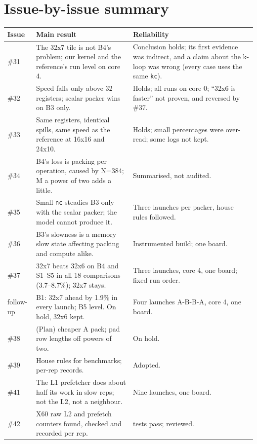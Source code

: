 \documentclass[11pt,a4paper]{article}
\begin{document}
\appendix
\newpage
\section{Issue-by-issue summary}
{\small
\begin{tabularx}{\linewidth}{@{}l >{\raggedright\arraybackslash}X >{\raggedright\arraybackslash}p{5.2cm}@{}}
\toprule
\textbf{Issue} & \textbf{Main result} & \textbf{Reliability} \\
\midrule
\#31 & The 32x7 tile is not B4's problem; our kernel and the reference's run level on core 4. & Conclusion holds; its
first evidence was indirect, and a claim about the k-loop was wrong (every case uses the same \texttt{kc}). \\
\#32 & Speed falls only above 32 registers; scalar packer wins on B3 only. & Holds; all runs on core 0; ``32x6 is
faster'' not proven, and reversed by \#37. \\
\#33 & Same registers, identical spills, same speed as the reference at 16x16 and 24x10. & Holds; small
percentages were over-read; some logs not kept. \\
\#34 & B4's loss is packing per operation, caused by N=384; M a power of two adds a little. & Summarised, not
audited. \\
\#35 & Small \texttt{nc} steadies B3 only with the scalar packer; the model cannot produce it. & Three launches
per packer, house rules followed. \\
\#36 & B3's slowness is a memory slow state affecting packing and compute alike. & Instrumented build; one board.
\\
\#37 & 32x7 beats 32x6 on B4 and S1--S5 in all 18 comparisons (3.7--8.7\%); 32x7 stays. & Three launches,
core 4, one board; fixed run order. \\
follow-up & B1: 32x7 ahead by 1.9\% in every launch; B5 level. On hold, 32x6 kept. & Four launches A-B-B-A,
core 4, one board. \\
\#38 & (Plan) cheaper A pack; pad row lengths off powers of two. & On hold. \\
\#39 & House rules for benchmarks; per-rep records. & Adopted. \\
\#41 & The L1 prefetcher does about half its work in slow reps; not the L2, not a neighbour. & Nine launches, one
board. \\
\#42 & X60 raw L2 and prefetch counters found, checked and recorded per rep. & 266 tests pass; reviewed. \\

\end{tabularx}}
\end{document}
